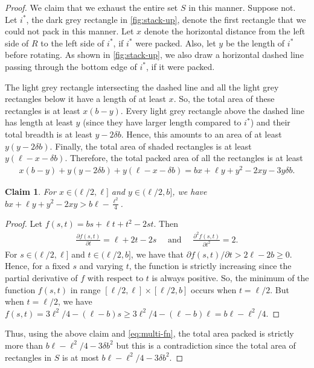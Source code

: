 \documentclass[10pt,a4paper]{amsart}
\newtheorem{claim}[theorem]{Claim}
\theoremstyle{definition}
\begin{document}
\begin{proof}
We claim that we exhaust the
entire set $S$ in this manner. Suppose not. Let $i^*$, the dark grey rectangle in \cref{fig:stack-up}, denote the
first rectangle that we could not pack in this manner.
Let $x$ denote the horizontal distance from the left side of $R$ to the left side of $i^*$, if $i^*$ were packed. Also, let $y$
be the length of $i^*$ before rotating.
As shown in \cref{fig:stack-up}, we also draw a horizontal dashed line passing through the bottom edge of $i^*$, if it were packed.

The light grey rectangle intersecting the dashed line and all the light grey rectangles below it have a length of at least $x$.
So, the total area of these rectangles is at least $x(b-y)$. Every light grey rectangle above the dashed line has
length at least $y$ (since they have larger length compared to $i^*$)
and their total breadth is at least $y-2\delta b$. Hence, this amounts to an area of at least $y(y-2\delta b)$.
Finally, the total area of shaded rectangles is at least $y(\ell-x-\delta b)$. Therefore, the total packed area of all the rectangles
is at least
\begin{align}
x(b-y)+y(y-2\delta b)+y(\ell-x-\delta b)=bx+\ell y+y^2-2xy-3y\delta b.\label{eq:multi-fn}
\end{align}
\begin{claim}
\label{claim:ineq-x-y}
For $x\in(\ell/2,\ell]$ and $y\in(\ell/2,b]$, we have $bx+\ell y+y^2-2xy> b\ell-\frac{\ell^2}{4}$.
\end{claim}
\begin{proof}
Let $f(s,t)=bs+\ell t+t^2-2st$. Then
\begin{align*}
\frac{\partial f(s,t)}{\partial t}=\ell+2t-2s\quad\text{ and }\quad \frac{\partial^2 f(s,t)}{\partial t^2}=2.
\end{align*}
For $s\in(\ell/2,\ell]$ and $t\in(\ell/2,b]$, we have that $\partial f(s,t)/\partial t>2\ell-2b\ge  0$.
Hence, for a fixed $s$ and varying $t$, the function is strictly increasing since the partial derivative
of $f$ with respect to $t$ is always positive. So, the minimum of the function $f(s,t)$ in range
$[\ell/2,\ell]\times[\ell/2,b]$ occurs when $t=\ell/2$. But when $t=\ell/2$, we have $f(s,t)=3\ell^2/4-(\ell-b) s\ge 3\ell^2/4-(\ell-b)\ell=b\ell-\ell^2/4$.
\end{proof}
Thus, using the above claim and \cref{eq:multi-fn}, the total area packed is strictly more than $b\ell-\ell^2/4-3\delta b^2$ but this is a contradiction since the total area of
rectangles in $S$ is at most $b\ell-\ell^2/4-3\delta b^2$.
\end{proof}
\end{document}
